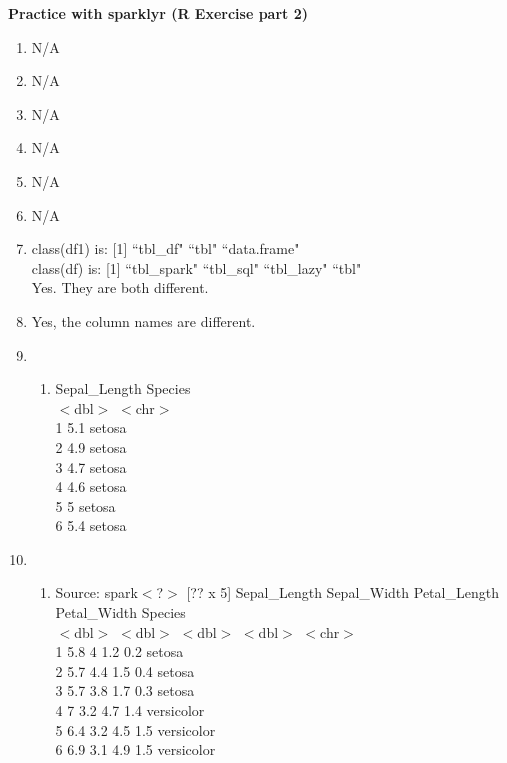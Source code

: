 \documentclass[12pt]{article}
\begin{document}
\textbf{Practice with sparklyr (R Exercise part 2)}

\begin{enumerate}
    \item N/A 
    \item N/A
    \item N/A
    \item N/A
    \item N/A
    \item N/A
    \item 
    class(df1) is: [1] ``tbl\_df"     ``tbl"        ``data.frame" \\
    class(df) is: [1] ``tbl\_spark" ``tbl\_sql"   ``tbl\_lazy"  ``tbl" \\
    
    Yes. They are both different. 
    
    \item Yes, the column names are different. 
    \item 
    \begin{enumerate}
        \item   Sepal\_Length Species \\
         $<$dbl$>$ $<$chr$>$ \\ 
1          5.1 setosa \\
 2         4.9 setosa \\
  3        4.7 setosa \\ 
   4       4.6 setosa \\
    5      5   setosa \\ 
     6     5.4 setosa \\
    \end{enumerate}
    \item 
    \begin{enumerate}
        \item 
         Source: spark$<$?$>$ [?? x 5]
  Sepal\_Length Sepal\_Width Petal\_Length Petal\_Width Species \\
         $<$dbl$>$       $<$dbl$>$        $<$dbl$>$       $<$dbl$>$ $<$chr$>$ \\
1          5.8         4            1.2         0.2 setosa \\
2          5.7         4.4          1.5         0.4 setosa \\
3          5.7         3.8          1.7         0.3 setosa \\
4          7           3.2          4.7         1.4 versicolor \\
5          6.4         3.2          4.5         1.5 versicolor \\
6          6.9         3.1          4.9         1.5 versicolor\\


\end{enumerate}
\end{enumerate}
\end{document}
